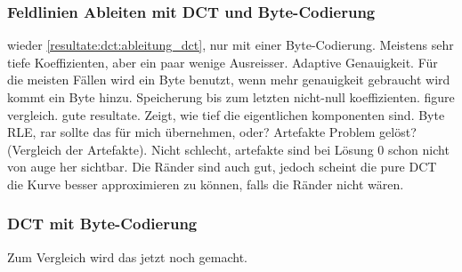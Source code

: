 \subsubsection{Feldlinien Ableiten mit DCT und Byte-Codierung}
wieder \ref{resultate:dct:ableitung_dct}, nur mit einer Byte-Codierung.
Meistens sehr tiefe Koeffizienten, aber ein paar wenige Ausreisser. Adaptive Genauigkeit. Für die meisten Fällen wird ein Byte benutzt, wenn mehr genauigkeit gebraucht wird kommt ein Byte hinzu.
Speicherung bis zum letzten nicht-null koeffizienten.
figure vergleich.
gute resultate. Zeigt, wie tief die eigentlichen komponenten sind.
Byte RLE, rar sollte das für mich übernehmen, oder?
Artefakte Problem gelöst?
(Vergleich der Artefakte). 
Nicht schlecht, artefakte sind bei Lösung 0 schon nicht von auge her sichtbar. Die Ränder sind auch gut, jedoch scheint die pure DCT die Kurve besser approximieren zu können, falls die Ränder nicht wären.

\subsubsection{DCT mit Byte-Codierung}
Zum Vergleich wird das jetzt noch gemacht.


